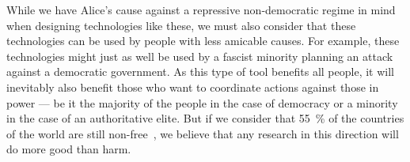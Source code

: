 While we have Alice's cause against a repressive non-democratic regime in mind 
when designing technologies like these, we must also consider that these 
technologies can be used by people with less amicable causes.
For example, these technologies might just as well be used by a fascist 
minority planning an attack against a democratic government.
As this type of tool benefits all people, it will inevitably also benefit those 
who want to coordinate actions against those in power --- be it the majority of 
the people in the case of democracy or a minority in the case of an 
authoritative elite.
But if we consider that \SI{55}{\%} of the countries of the world are still 
non-free~\cite{FreedomInTheWorld2017}, we believe that any research in this 
direction will do more good than harm.

